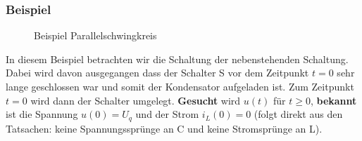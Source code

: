 \subsubsection{Beispiel}
\begin{wrapfigure}{l}{0.5\textwidth}
	\centering
	
	\caption{Beispiel Parallelschwingkreis}
	\label{fig:ParallelSkBsp}
\end{wrapfigure}
In diesem Beispiel betrachten wir die Schaltung der nebenstehenden Schaltung.
Dabei wird davon ausgegangen dass der Schalter S vor dem Zeitpunkt $t = 0$ sehr
lange geschlossen war und somit der Kondensator aufgeladen ist. Zum Zeitpunkt
$t=0$ wird dann der Schalter umgelegt. \textbf{Gesucht} wird $u(t)$ für $t \geq
0$, \textbf{bekannt} ist die Spannung $u(0) = U_q$ und der Strom $i_L(0) = 0$
(folgt direkt aus den Tatsachen: keine Spannungssprünge an C und keine
Stromsprünge an L). \\

